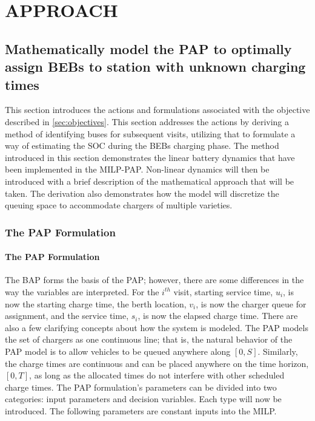 \documentclass[ee,msthesis]{usuthesis}
\begin{document}
\chapter{APPROACH}
\label{sec:proposed-project}
\section{Mathematically model the PAP to optimally assign BEBs to station with unknown charging times}
\label{sec:math-model-pap}
This section introduces the actions and formulations associated with the objective described in \ref{sec:objectives}. This
section addresses the actions by deriving a method of identifying buses for subsequent visits, utilizing that to
formulate a way of estimating the SOC during the BEBs charging phase. The method introduced in this section demonstrates
the linear battery dynamics that have been implemented in the MILP-PAP. Non-linear dynamics will then be introduced with
a brief description of the mathematical approach that will be taken. The derivation also demonstrates how the model will
discretize the queuing space to accommodate chargers of multiple varieties.

\subsection{The PAP Formulation}
\label{sec:input-variables}
\subsubsection{The PAP Formulation}
\label{sec:the-pap-formulation}
The BAP forms the basis of the PAP; however, there are some differences in the way the variables are interpreted. For the
\(i^{th}\) visit, starting service time, \(u_i\), is now the starting charge time, the berth location, \(v_i\), is now the
charger queue for assignment, and the service time, \(s_i\), is now the elapsed charge time. There are also a few clarifying concepts
about how the system is modeled. The PAP models the set of chargers as one continuous line; that is, the natural
behavior of the PAP model is to allow vehicles to be queued anywhere along \([0,S]\). Similarly, the charge times are
continuous and can be placed anywhere on the time horizon, \([0,T]\), as long as the allocated times do not interfere with
other scheduled charge times. The PAP formulation's parameters can be divided into two categories: input parameters and
decision variables. Each type will now be introduced. The following parameters are constant inputs into the MILP.
\end{document}
